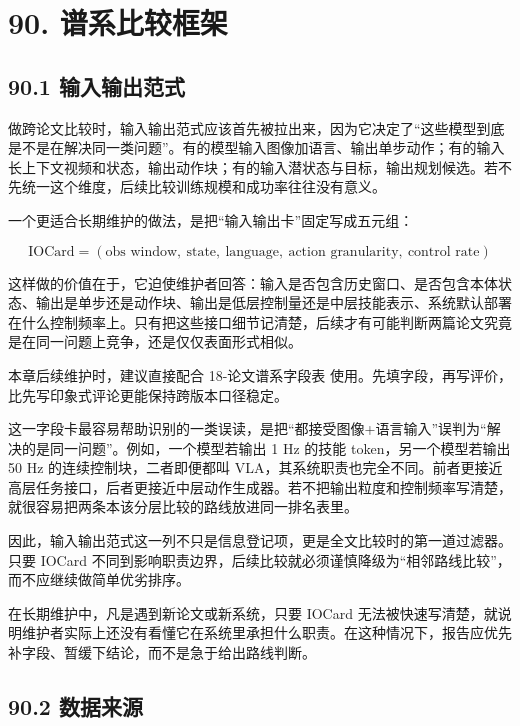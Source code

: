 \section*{90. 谱系比较框架}

\subsection*{90.1 输入输出范式}


做跨论文比较时，输入输出范式应该首先被拉出来，因为它决定了“这些模型到底是不是在解决同一类问题”。有的模型输入图像加语言、输出单步动作；有的输入长上下文视频和状态，输出动作块；有的输入潜状态与目标，输出规划候选。若不先统一这个维度，后续比较训练规模和成功率往往没有意义。

一个更适合长期维护的做法，是把“输入输出卡”固定写成五元组：

\begingroup
\scriptsize
\begin{equation*}
\text{IOCard}=(\text{obs window},\ \text{state},\ \text{language},\ \text{action granularity},\ \text{control rate})
\end{equation*}
\endgroup

这样做的价值在于，它迫使维护者回答：输入是否包含历史窗口、是否包含本体状态、输出是单步还是动作块、输出是低层控制量还是中层技能表示、系统默认部署在什么控制频率上。只有把这些接口细节记清楚，后续才有可能判断两篇论文究竟是在同一问题上竞争，还是仅仅表面形式相似。

本章后续维护时，建议直接配合 18-论文谱系字段表 使用。先填字段，再写评价，比先写印象式评论更能保持跨版本口径稳定。

这一字段卡最容易帮助识别的一类误读，是把“都接受图像+语言输入”误判为“解决的是同一问题”。例如，一个模型若输出 1 Hz 的技能 token，另一个模型若输出 50 Hz 的连续控制块，二者即便都叫 VLA，其系统职责也完全不同。前者更接近高层任务接口，后者更接近中层动作生成器。若不把输出粒度和控制频率写清楚，就很容易把两条本该分层比较的路线放进同一排名表里。

因此，输入输出范式这一列不只是信息登记项，更是全文比较时的第一道过滤器。只要 IOCard 不同到影响职责边界，后续比较就必须谨慎降级为“相邻路线比较”，而不应继续做简单优劣排序。

在长期维护中，凡是遇到新论文或新系统，只要 IOCard 无法被快速写清楚，就说明维护者实际上还没有看懂它在系统里承担什么职责。在这种情况下，报告应优先补字段、暂缓下结论，而不是急于给出路线判断。

\subsection*{90.2 数据来源}


